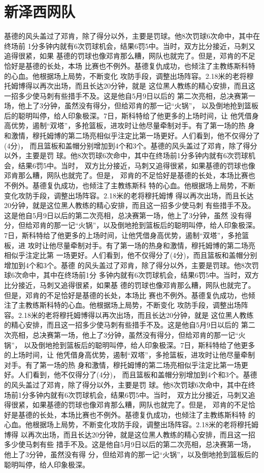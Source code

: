 \documentclass[openany]{book}
\begin{document}
\section{新泽西网队}
基德的风头盖过了邓肯，除了得分以外，主要是罚球。他8次罚球6次命中，其中在终场前
1分多钟内就有6次罚球机会，结果6罚5中。当时，双方比分接近，马刺又追得很紧，如果
基德的罚球也像邓肯那么糟，网队也就完了。但是，邓肯的不足恰好是基德的长处，本场
比赛也不例外。基德复仇成功，也倾注了主教练斯科特的心血。他根据场上局势，不断变化
攻防手段，调整出场阵容。2.18米的老将穆托姆博得以再次出场，而且长达20分钟，就是
这位黑人教练的精心安排，而且这一招多少使马刺有些措手不及。这是他自5月9日以后的
第二次亮相，总决赛第一场，他上了3分钟，虽然没有得分，但给邓肯的那一记“火锅”，
以及倒地抢到篮板后的聪明叫停，给人印象极深。7日，斯科特给了他更多的上场时间，让
他凭借身高优势，遏制“双塔”，多抢篮板，进攻时让他尽量牵制对手。有了第一场的热
身和激情，穆托姆博的第二场亮相似乎注定比第一场更好。人们看到，他不仅得分了(4分)，
而且篮板和盖帽分别增加到4个和3个。基德的风头盖过了邓肯，除了得分以外，主要是罚
球。他8次罚球6次命中，其中在终场前1分多钟内就有6次罚球机会，结果6罚5中。当时，
双方比分接近，马刺又追得很紧，如果基德的罚球也像邓肯那么糟，网队也就完了。但是，
邓肯的不足恰好是基德的长处，本场比赛也不例外。基德复仇成功，也倾注了主教练斯科
特的心血。他根据场上局势，不断变化攻防手段，调整出场阵容。2.18米的老将穆托姆博
得以再次出场，而且长达20分钟，就是这位黑人教练的精心安排，而且这一招多少使马刺
有些措手不及。这是他自5月9日以后的第二次亮相，总决赛第一场，他上了3分钟，虽然
没有得分，但给邓肯的那一记“火锅”，以及倒地抢到篮板后的聪明叫停，给人印象极深。
7日，斯科特给了他更多的上场时间，让他凭借身高优势，遏制“双塔”，多抢篮板，进
攻时让他尽量牵制对手。有了第一场的热身和激情，穆托姆博的第二场亮相似乎注定比第
一场更好。人们看到，他不仅得分了(4分)，而且篮板和盖帽分别增加到4个和3个。基德
的风头盖过了邓肯，除了得分以外，主要是罚球。他8次罚球6次命中，其中在终场前1分
多钟内就有6次罚球机会，结果6罚5中。当时，双方比分接近，马刺又追得很紧，如果基
德的罚球也像邓肯那么糟，网队也就完了。但是，邓肯的不足恰好是基德的长处，本场比
赛也不例外。基德复仇成功，也倾注了主教练斯科特的心血。他根据场上局势，不断变化
攻防手段，调整出场阵容。2.18米的老将穆托姆博得以再次出场，而且长达20分钟，就是
这位黑人教练的精心安排，而且这一招多少使马刺有些措手不及。这是他自5月9日以后的
第二次亮相，总决赛第一场，他上了3分钟，虽然没有得分，但给邓肯的那一记“火锅”，
以及倒地抢到篮板后的聪明叫停，给人印象极深。7日，斯科特给了他更多的上场时间，让
他凭借身高优势，遏制“双塔”，多抢篮板，进攻时让他尽量牵制对手。有了第一场的热
身和激情，穆托姆博的第二场亮相似乎注定比第一场更好。人们看到，他不仅得分了(4分)，
而且篮板和盖帽分别增加到4个和3个。基德的风头盖过了邓肯，除了得分以外，主要是罚
球。他8次罚球6次命中，其中在终场前1分多钟内就有6次罚球机会，结果6罚5中。当时，
双方比分接近，马刺又追得很紧，如果基德的罚球也像邓肯那么糟，网队也就完了。但是，
邓肯的不足恰好是基德的长处，本场比赛也不例外。基德复仇成功，也倾注了主教练斯科特
的心血。他根据场上局势，不断变化攻防手段，调整出场阵容。2.18米的老将穆托姆博得
以再次出场，而且长达20分钟，就是这位黑人教练的精心安排，而且这一招多少使马刺有些
措手不及。这是他自5月9日以后的第二次亮相，总决赛第一场，他上了3分钟，虽然没有得
分，但给邓肯的那一记“火锅”，以及倒地抢到篮板后的聪明叫停，给人印象极深。
\end{document}

